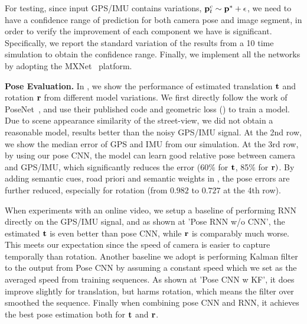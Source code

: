 For testing, since input GPS/IMU contains variations, \ie ${\mathbf p}_t^c \sim {\mathbf p}^* + \epsilon$, we need to have a confidence range of prediction for both camera pose and image segment, in order to verify the improvement of each component we have is significant. Specifically, we report the standard variation of the results from a 10 time simulation to obtain the confidence range. Finally, we implement all the networks by adopting the MXNet~\cite{ChenLLLWWXXZZ15} platform.

\textbf{Pose Evaluation.}
In , we show the performance of estimated translation ${\mathbf t}$ and rotation ${\mathbf r}$ from different model variations. We first directly follow the work of PoseNet~\cite{Kendall_2015_ICCV,kendall2017geometric}, and use their published code and geometric loss () to train a model. 
Due to scene appearance similarity of the street-view, we did not obtain a reasonable model, \ie results better than the noisy GPS/IMU signal.
At the 2nd row, we show the median error of GPS and IMU from our simulation. At the 3rd row, by using our pose CNN, the model can learn good relative pose between camera and GPS/IMU, which significantly reduces the error (60$\%$ for ${\mathbf t}$, 85$\%$ for ${\mathbf r})$. 
By adding semantic cues, \ie road priori and semantic weights in , the pose errors are further reduced, especially for rotation (from $0.982$ to $0.727$ at the 4th row). 

When experiments with an online video, we setup a baseline of performing RNN directly on the GPS/IMU signal, and as shown at 'Pose RNN w/o CNN', the estimated ${\mathbf t}$ is even better than pose CNN, while ${\mathbf r}$ is comparably much worse. This meets our expectation since the speed of camera is easier to capture temporally than rotation. Another baseline we adopt is performing Kalman filter~\cite{kalman1960new} to the output from Pose CNN by assuming a constant speed which we set as the averaged speed from training sequences. As shown at 'Pose CNN w KF', it does improve slightly for translation, but harms rotation, which means the filter over smoothed the sequence. Finally when combining pose CNN and RNN, it achieves the best pose estimation both for ${\mathbf t}$ and ${\mathbf r}$.



